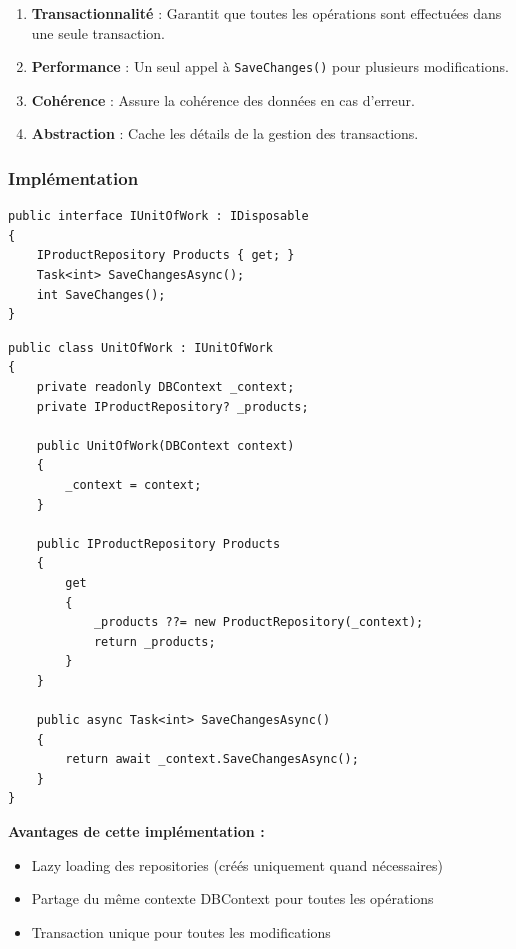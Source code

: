 \documentclass[12pt,a4paper]{article}
\begin{document}
\begin{enumerate}
    \item \textbf{Transactionnalité} : Garantit que toutes les opérations sont effectuées dans une seule transaction.
    \item \textbf{Performance} : Un seul appel à \texttt{SaveChanges()} pour plusieurs modifications.
    \item \textbf{Cohérence} : Assure la cohérence des données en cas d'erreur.
    \item \textbf{Abstraction} : Cache les détails de la gestion des transactions.
\end{enumerate}

\subsubsection{Implémentation}

\begin{lstlisting}[caption=Interface IUnitOfWork, float=h!]
public interface IUnitOfWork : IDisposable
{
    IProductRepository Products { get; }
    Task<int> SaveChangesAsync();
    int SaveChanges();
}
\end{lstlisting}

\begin{lstlisting}[caption=Implémentation UnitOfWork, float=h!]
public class UnitOfWork : IUnitOfWork
{
    private readonly DBContext _context;
    private IProductRepository? _products;

    public UnitOfWork(DBContext context)
    {
        _context = context;
    }

    public IProductRepository Products
    {
        get
        {
            _products ??= new ProductRepository(_context);
            return _products;
        }
    }

    public async Task<int> SaveChangesAsync()
    {
        return await _context.SaveChangesAsync();
    }
}
\end{lstlisting}

\textbf{Avantages de cette implémentation :}
\begin{itemize}
    \item Lazy loading des repositories (créés uniquement quand nécessaires)
    \item Partage du même contexte DBContext pour toutes les opérations
    \item Transaction unique pour toutes les modifications
\end{itemize}
\end{document}

